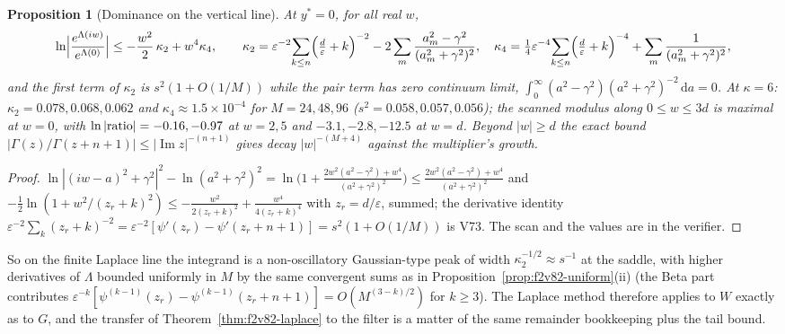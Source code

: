 \documentclass[11pt]{article}
\newtheorem{proposition}[theorem]{Proposition}
\theoremstyle{definition}
\theoremstyle{remark}
\newcommand{\dd}{\,\mathrm d}
\begin{document}
\begin{proposition}[Dominance on the vertical line]
\label{prop:f2v82-dominance}
At \(y^*=0\), for all real \(w\),
\begin{equation}
 \ln\Bigl|\frac{e^{\Lambda(iw)}}{e^{\Lambda(0)}}\Bigr|
 \le-\frac{w^2}2\,\kappa_2+w^4\kappa_4,\qquad
 \kappa_2=\varepsilon^{-2}\!\sum_{k\le n}\Bigl(\tfrac d\varepsilon+k\Bigr)^{-2}
 -2\sum_m\frac{a_m^2-\gamma^2}{(a_m^2+\gamma^2)^2},\quad
 \kappa_4=\tfrac14\varepsilon^{-4}\!\sum_{k\le n}\Bigl(\tfrac d\varepsilon+k\Bigr)^{-4}+\sum_m\frac1{(a_m^2+\gamma^2)^2},
 \label{eq:f2v82-mod}
\end{equation}
and the first term of \(\kappa_2\) is \(s^2(1+O(1/M))\) while the pair
term has zero continuum limit, \(\int_0^\infty(a^2-\gamma^2)(a^2+\gamma^2)^{-2}\dd a=0\).
At \(\kappa=6\): \(\kappa_2=0.078,0.068,0.062\) and \(\kappa_4\approx1.5\times10^{-4}\)
for \(M=24,48,96\) (\(s^2=0.058,0.057,0.056\)); the scanned modulus
along \(0\le w\le3d\) is maximal at \(w=0\), with
\(\ln|{\rm ratio}|=-0.16,-0.97\) at \(w=2,5\) and \(-3.1,-2.8,-12.5\) at
\(w=d\).  Beyond \(|w|\ge d\) the exact bound
\(|\Gamma(z)/\Gamma(z+n+1)|\le|\operatorname{Im}z|^{-(n+1)}\) gives decay
\(|w|^{-(M+4)}\) against the multiplier's growth.
\end{proposition}

\begin{proof}
\(\ln|(iw-a)^2+\gamma^2|^2-\ln(a^2+\gamma^2)^2=\ln\bigl(1+\tfrac{2w^2(a^2-\gamma^2)+w^4}{(a^2+\gamma^2)^2}\bigr)\le\tfrac{2w^2(a^2-\gamma^2)+w^4}{(a^2+\gamma^2)^2}\)
and \(-\tfrac12\ln(1+w^2/(z_r+k)^2)\le-\tfrac{w^2}{2(z_r+k)^2}+\tfrac{w^4}{4(z_r+k)^4}\)
with \(z_r=d/\varepsilon\), summed; the derivative identity
\(\varepsilon^{-2}\sum_k(z_r+k)^{-2}=\varepsilon^{-2}[\psi'(z_r)-\psi'(z_r+n+1)]=s^2(1+O(1/M))\)
is V73.  The scan and the values are in the verifier.
\end{proof}

So on the finite Laplace line the integrand is a non-oscillatory
Gaussian-type peak of width \(\kappa_2^{-1/2}\approx s^{-1}\) at the saddle,
with higher derivatives of \(\Lambda\) bounded uniformly in \(M\) by the
same convergent sums as in Proposition~\ref{prop:f2v82-uniform}(ii)
(the Beta part contributes \(\varepsilon^{-k}[\psi^{(k-1)}(z_r)-\psi^{(k-1)}(z_r+n+1)]=O(M^{(3-k)/2})\)
for \(k\ge3\)).  The Laplace method therefore applies to \(W\) exactly
as to \(G\), and the transfer of Theorem~\ref{thm:f2v82-laplace} to the
filter is a matter of the same remainder bookkeeping plus the tail
bound.
\end{document}
